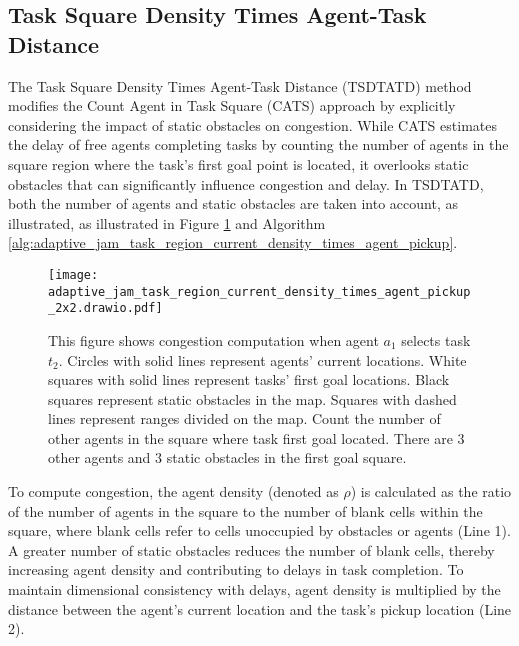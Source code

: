 \documentclass[letterpaper]{article} %
\begin{document}
\subsection{Task Square Density Times Agent-Task Distance}

The Task Square Density Times Agent-Task Distance (TSDTATD) method modifies the Count Agent in Task Square (CATS) approach by explicitly considering the impact of static obstacles on congestion. 
While CATS estimates the delay of free agents completing tasks by counting the number of agents in the square region where the task’s first goal point is located, 
it overlooks static obstacles that can significantly influence congestion and delay. 
In TSDTATD, both the number of agents and static obstacles are taken into account, as illustrated, as illustrated in Figure \ref{fig:adaptive_jam_task_region_current_density_times_agent_pickup} and Algorithm \ref{alg:adaptive_jam_task_region_current_density_times_agent_pickup}. 


\begin{figure}[t]
    \centering
    \texttt{[image: adaptive\_jam\_task\_region\_current\_density\_times\_agent\_pickup\_2x2.drawio.pdf]}
    \caption{This figure shows congestion computation when agent $a_1$ selects task $t_2$. 
    Circles with solid lines represent agents' current locations.
    White squares with solid lines represent tasks' first goal locations.
    Black squares represent static obstacles in the map. 
    Squares with dashed lines represent ranges divided on the map.
    Count the number of other agents in the square where task first goal located. 
    There are 3 other agents and 3 static obstacles in the first goal square.
    }
    \label{fig:adaptive_jam_task_region_current_density_times_agent_pickup}
\end{figure}


To compute congestion, 
the agent density (denoted as $\rho$) is calculated as the ratio of the number of agents in the square to the number of blank cells within the square, where blank cells refer to cells unoccupied by obstacles or agents (Line 1). 
A greater number of static obstacles reduces the number of blank cells, thereby increasing agent density and contributing to delays in task completion. 
To maintain dimensional consistency with delays, agent density is multiplied by the distance between the agent’s current location and the task’s pickup location (Line 2). 
\end{document}
